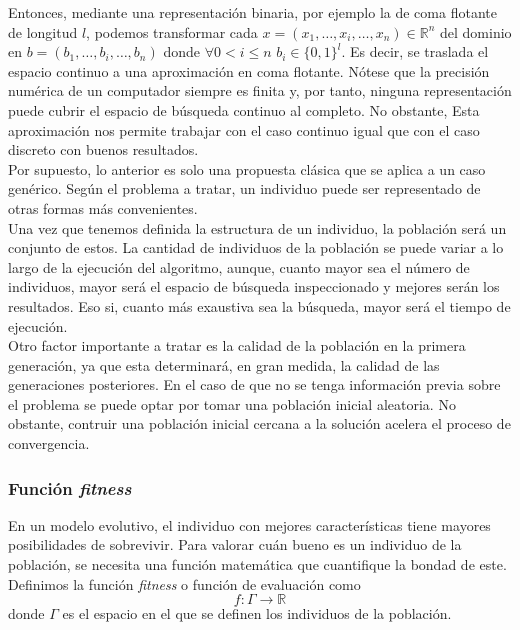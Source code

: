 			Entonces, mediante una representaci\'on binaria, por ejemplo la de coma flotante de longitud $l$, podemos transformar cada $x=(x_1,\dots,x_i,\dots,x_n) \in \mathbb{R}^n$ del dominio en $b=(b_1,\dots,b_i,\dots,b_n)$ donde $\forall  0<i\leq n$ $b_i \in \{0,1\}^l$. Es decir, se traslada el espacio continuo a una aproximaci\'on en coma flotante. N\'otese que la precisi\'on num\'erica de un computador siempre es finita y, por tanto, ninguna representaci\'on puede cubrir el espacio de b\'usqueda continuo al completo. No obstante, Esta aproximaci\'on nos permite trabajar con el caso continuo igual que con el caso discreto con buenos resultados.\\
			
			Por supuesto, lo anterior es solo una propuesta cl\'asica que se aplica a un caso gen\'erico. Seg\'un el problema a tratar, un individuo puede ser representado de otras formas m\'as convenientes.\\
			
			Una vez que tenemos definida la estructura de un individuo, la poblaci\'on ser\'a un conjunto de estos. La cantidad de individuos de la poblaci\'on se puede variar a lo largo de la ejecuci\'on del algoritmo, aunque, cuanto mayor sea el n\'umero de individuos, mayor ser\'a el espacio de b\'usqueda inspeccionado y mejores ser\'an los resultados. Eso si, cuanto m\'as exaustiva sea la b\'usqueda, mayor ser\'a el tiempo de ejecuci\'on.\\
			
			Otro factor importante a tratar es la calidad de la poblaci\'on en la primera generaci\'on, ya que esta determinar\'a, en gran medida, la calidad de las generaciones posteriores. En el caso de que no se tenga informaci\'on previa sobre el problema se puede optar por tomar una poblaci\'on inicial aleatoria. No obstante, contruir una poblaci\'on inicial cercana a la soluci\'on acelera el proceso de convergencia. 
				
			\subsubsection{Funci\'on \textit{fitness}}
			En un modelo evolutivo, el individuo con mejores caracter\'isticas tiene mayores posibilidades de sobrevivir. Para valorar cu\'an bueno es un individuo de la poblaci\'on, se necesita una funci\'on matem\'atica que cuantifique la bondad de este. Definimos la funci\'on \textit{fitness} o funci\'on de evaluaci\'on como 
			\[f:\Gamma\rightarrow\mathbb{R}\]
			donde $\Gamma$ es el espacio en el que se definen los individuos de la poblaci\'on.\\
			
